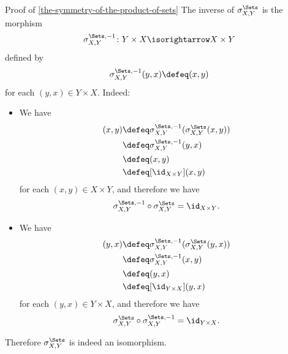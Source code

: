 \begin{Proof}{Proof of \cref{the-symmetry-of-the-product-of-sets}}%
    The inverse of $\sigma^{\Sets}_{X,Y}$ is the morphism
    \[
        \sigma^{\Sets,-1}_{X,Y}
        \colon
        Y\times X
        \isorightarrow
        X\times Y
    \]%
    defined by
    \[
        \sigma^{\Sets,-1}_{X,Y}(y,x)%
        \defeq%
        (x,y)
    \]%
    for each $(y,x)\in Y\times X$. Indeed:
    \begin{itemize}
        \item{}We have
            \begin{align*}
                [\sigma^{\Sets,-1}_{X,Y}\circ\sigma^{\Sets}_{X,Y}](x,y) &\defeq \sigma^{\Sets,-1}_{X,Y}(\sigma^{\Sets}_{X,Y}(x,y))\\
                                                                        &\defeq \sigma^{\Sets,-1}_{X,Y}(y,x)\\
                                                                        &\defeq (x,y)\\
                                                                        &\defeq [\id_{X\times Y}](x,y)
            \end{align*}
            for each $(x,y)\in X\times Y$, and therefore we have
            \[
                \sigma^{\Sets,-1}_{X,Y}\circ\sigma^{\Sets}_{X,Y}%
                =%
                \id_{X\times Y}.%
            \]%
        \item{}We have
            \begin{align*}
                [\sigma^{\Sets}_{X,Y}\circ\sigma^{\Sets,-1}_{X,Y}](y,x) &\defeq \sigma^{\Sets,-1}_{X,Y}(\sigma^{\Sets}_{X,Y}(y,x))\\
                                                                        &\defeq \sigma^{\Sets,-1}_{X,Y}(x,y)\\
                                                                        &\defeq (y,x)\\
                                                                        &\defeq [\id_{Y\times X}](y,x)
            \end{align*}
            for each $(y,x)\in Y\times X$, and therefore we have
            \[
                \sigma^{\Sets}_{X,Y}\circ\sigma^{\Sets,-1}_{X,Y}%
                =%
                \id_{Y\times X}.%
            \]%
    \end{itemize}
    Therefore $\sigma^{\Sets}_{X,Y}$ is indeed an isomorphism.


\end{Proof}
